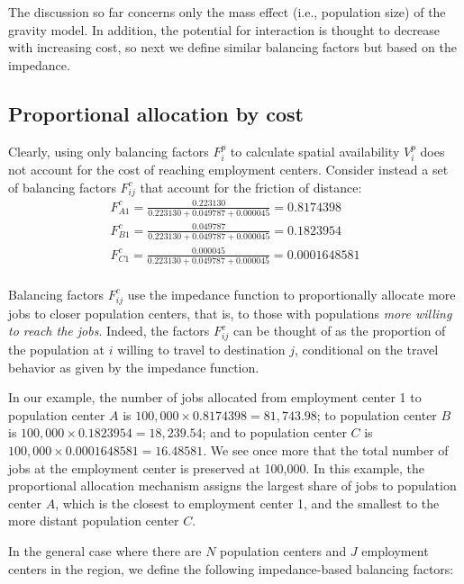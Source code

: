 \documentclass[]{elsarticle} %
\begin{document}
The discussion so far concerns only the mass effect (i.e., population
size) of the gravity model. In addition, the potential for interaction
is thought to decrease with increasing cost, so next we define similar
balancing factors but based on the impedance.

\hypertarget{proportional-allocation-by-cost}{%
\subsection{Proportional allocation by
cost}\label{proportional-allocation-by-cost}}

Clearly, using only balancing factors \(F^p_{i}\) to calculate spatial
availability \(V^p_i\) does not account for the cost of reaching
employment centers. Consider instead a set of balancing factors
\(F^c_{ij}\) that account for the friction of distance: \[
\begin{array}{l}
F^c_{A1} = \frac{0.223130}{0.223130 + 0.049787 + 0.000045} = 0.8174398\\
F^c_{B1} = \frac{0.049787}{0.223130 + 0.049787 + 0.000045} = 0.1823954\\
F^c_{C1} = \frac{0.000045}{0.223130 + 0.049787 + 0.000045} = 0.0001648581\\
\end{array}
\]

Balancing factors \(F^c_{ij}\) use the impedance function to
proportionally allocate more jobs to closer population centers, that is,
to those with populations \emph{more willing to reach the jobs}. Indeed,
the factors \(F^c_{ij}\) can be thought of as the proportion of the
population at \(i\) willing to travel to destination \(j\), conditional
on the travel behavior as given by the impedance function.

In our example, the number of jobs allocated from employment center 1 to
population center \(A\) is \(100,000\times 0.8174398 = 81,743.98\); to
population center \(B\) is \(100,000\times 0.1823954 = 18,239.54\); and
to population center \(C\) is \(100,000\times 0.0001648581 = 16.48581\).
We see once more that the total number of jobs at the employment center
is preserved at 100,000. In this example, the proportional allocation
mechanism assigns the largest share of jobs to population center \(A\),
which is the closest to employment center 1, and the smallest to the
more distant population center \(C\).

In the general case where there are \(N\) population centers and \(J\)
employment centers in the region, we define the following
impedance-based balancing factors:
\end{document}
